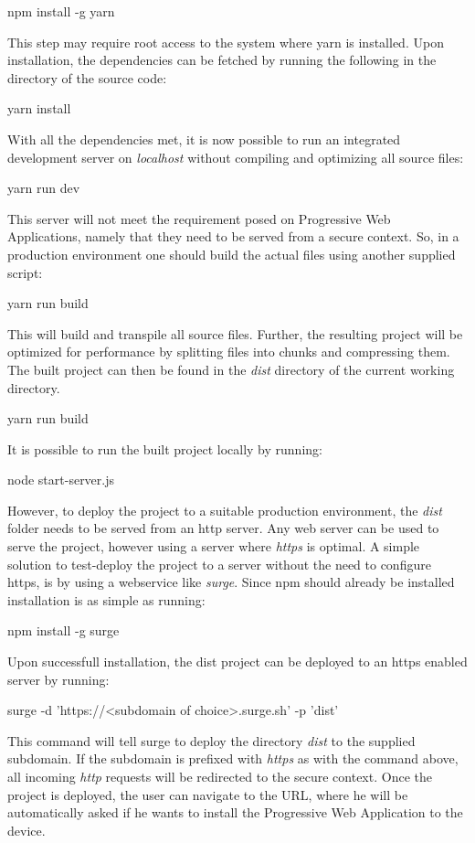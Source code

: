 \begin{framed}
npm install -g yarn
\end{framed}
This step may require root access to the system where yarn is installed. Upon installation, the dependencies can be fetched by running the following in the directory of the source code:
\begin{framed}
yarn install
\end{framed}
With all the dependencies met, it is now possible to run an integrated development server on \textit{localhost} without compiling and optimizing all source files:
\begin{framed}
yarn run dev\end{framed}
This server will not meet the requirement posed on Progressive Web Applications, namely that they need to be served from a secure context.
So, in a production environment one should build the actual files using another supplied script:
\begin{framed}
yarn run build\end{framed}
This will build and transpile all source files. Further, the resulting project will be optimized for performance by splitting files into chunks and compressing them. The built project can then be found in the \textit{dist} directory of the current working directory.
\begin{framed}
yarn run build
\end{framed}
It is possible to run the built project locally by running:
\begin{framed}
node start-server.js
\end{framed}
However, to deploy the project to a suitable production environment, the \textit{dist} folder needs to be served from an http server. Any web server can be used to serve the project, however using a server where \textit{https} is optimal. A simple solution to test-deploy the project to a server without the need to configure https, is by using a webservice like \textit{surge}. Since npm should already be installed installation is as simple as running:
\begin{framed}
npm install -g surge
\end{framed}
Upon successfull installation, the dist project can be deployed to an https enabled server by running:
\begin{framed}
surge -d 'https://<subdomain of choice>.surge.sh' -p 'dist'
\end{framed}
This command will tell surge to deploy the directory \textit{dist} to the supplied subdomain. If the subdomain is prefixed with \textit{https} as with the command above, all incoming \textit{http} requests will be redirected to the secure context.
Once the project is deployed, the user can navigate to the URL, where he will be automatically asked if he wants to install the Progressive Web Application to the device.

